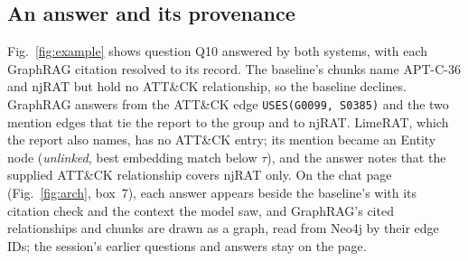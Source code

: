 \documentclass[conference,letterpaper]{IEEEtran}
\newcommand{\code}[1]{\texttt{#1}}
\begin{document}
\subsection{An answer and its provenance}
Fig.~\ref{fig:example} shows question Q10 answered by both systems, with each GraphRAG citation resolved to its record. The baseline's chunks name APT-C-36 and njRAT but hold no ATT\&CK relationship, so the baseline declines. GraphRAG answers from the ATT\&CK edge \code{USES(G0099, S0385)} and the two mention edges that tie the report to the group and to njRAT. LimeRAT, which the report also names, has no ATT\&CK entry; its mention became an Entity node (\emph{unlinked}, best embedding match below $\tau$), and the answer notes that the supplied ATT\&CK relationship covers njRAT only. On the chat page (Fig.~\ref{fig:arch}, box~7), each answer appears beside the baseline's with its citation check and the context the model saw, and GraphRAG's cited relationships and chunks are drawn as a graph, read from Neo4j by their edge IDs; the session's earlier questions and answers stay on the page.
\end{document}
